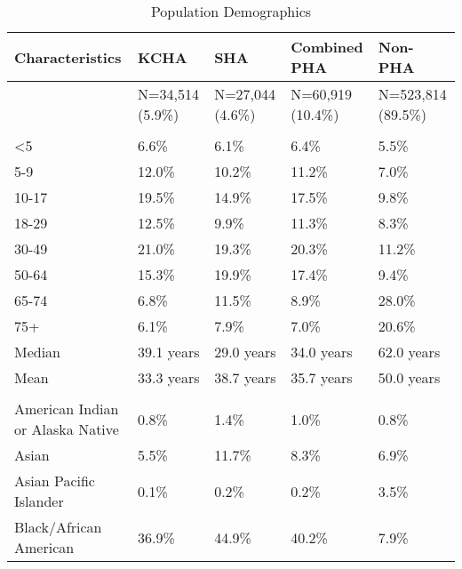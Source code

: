 \documentclass [11pt, proquest] {uwthesis}[2015/03/03]
\begin{document}
\begin{table}
  \caption{\label{tab:unnamed-chunk-1}Population Demographics}
  \centering
  \fontsize{12}{14}\selectfont
  \begin{tabu} to 
  \toprule
  Characteristics & KCHA & SHA & Combined PHA & Non-PHA\\
  \midrule
   & N=34,514 (5.9\%) & N=27,044  (4.6\%) & N=60,919  (10.4\%) & N=523,814 (89.5\%)\\
  \addlinespace[0.3em]
  \\
  \hspace{1em}<5 & 6.6\% & 6.1\% & 6.4\% & 5.5\%\\
  \hspace{1em}5-9 & 12.0\% & 10.2\% & 11.2\% & 7.0\%\\
  \hspace{1em}10-17 & 19.5\% & 14.9\% & 17.5\% & 9.8\%\\
  \hspace{1em}18-29 & 12.5\% & 9.9\% & 11.3\% & 8.3\%\\
  \hspace{1em}30-49 & 21.0\% & 19.3\% & 20.3\% & 11.2\%\\
  \hspace{1em}50-64 & 15.3\% & 19.9\% & 17.4\% & 9.4\%\\
  \hspace{1em}65-74 & 6.8\% & 11.5\% & 8.9\% & 28.0\%\\
  \hspace{1em}75+ & 6.1\% & 7.9\% & 7.0\% & 20.6\%\\
  \hspace{1em}Median & 39.1 years & 29.0 years & 34.0 years & 62.0 years\\
  \hspace{1em}Mean & 33.3 years & 38.7 years & 35.7 years & 50.0 years\\
  \addlinespace[0.3em]
  \\
  \hspace{1em}American Indian or Alaska Native & 0.8\% & 1.4\% & 1.0\% & 0.8\%\\
  \hspace{1em}Asian & 5.5\% & 11.7\% & 8.3\% & 6.9\%\\
  \hspace{1em}Asian Pacific Islander & 0.1\% & 0.2\% & 0.2\% & 3.5\%\\
  \hspace{1em}Black/African American & 36.9\% & 44.9\% & 40.2\% & 7.9\%\\

\end{tabu}
\end{table}
\end{document}
